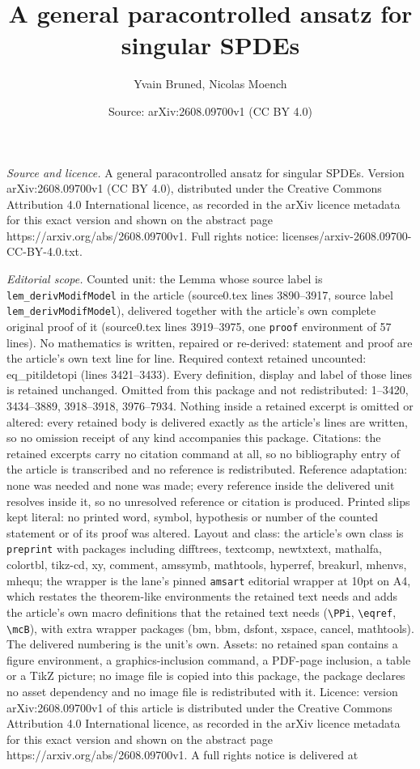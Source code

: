 \documentclass[10pt,a4paper]{amsart}
\title[A general paracontrolled ansatz for singular SPDEs]{A general paracontrolled ansatz for singular SPDEs}
\author{Yvain Bruned, Nicolas Moench}
\date{Source: arXiv:2608.09700v1 (CC BY 4.0)}
\begin{document}
\maketitle

\noindent\emph{Source and licence.} A general paracontrolled ansatz for singular SPDEs. Version arXiv:2608.09700v1 (CC BY 4.0), distributed under the Creative Commons Attribution 4.0 International licence, as recorded in the arXiv licence metadata for this exact version and shown on the abstract page https://arxiv.org/abs/2608.09700v1. Full rights notice: licenses/arxiv-2608.09700-CC-BY-4.0.txt.\par\smallskip

\noindent\textit{Editorial scope.} Counted unit: the Lemma whose source label is \texttt{lem\_derivModifModel} in the article (source0.tex lines 3890--3917, source label \texttt{lem\_derivModifModel}), delivered together with the article's own complete original proof of it (source0.tex lines 3919--3975, one \texttt{proof} environment of 57 lines). No mathematics is written, repaired or re-derived: statement and proof are the article's own text line for line. Required context retained uncounted: eq\_pitildetopi (lines 3421--3433). Every definition, display and label of those lines is retained unchanged. Omitted from this package and not redistributed: 1--3420, 3434--3889, 3918--3918, 3976--7934. Nothing inside a retained excerpt is omitted or altered: every retained body is delivered exactly as the article's lines are written, so no omission receipt of any kind accompanies this package. Citations: the retained excerpts carry no citation command at all, so no bibliography entry of the article is transcribed and no reference is redistributed. Reference adaptation: none was needed and none was made; every reference inside the delivered unit resolves inside it, so no unresolved reference or citation is produced. Printed slips kept literal: no printed word, symbol, hypothesis or number of the counted statement or of its proof was altered. Layout and class: the article's own class is \texttt{preprint} with packages including difftrees, textcomp, newtxtext, mathalfa, colortbl, tikz-cd, xy, comment, amssymb, mathtools, hyperref, breakurl, mhenvs, mhequ; the wrapper is the lane's pinned \texttt{amsart} editorial wrapper at 10pt on A4, which restates the theorem-like environments the retained text needs and adds the article's own macro definitions that the retained text needs (\texttt{\textbackslash PPi}, \texttt{\textbackslash eqref}, \texttt{\textbackslash mcB}), with extra wrapper packages (bm, bbm, dsfont, xspace, cancel, mathtools). The delivered numbering is the unit's own. Assets: no retained span contains a figure environment, a graphics-inclusion command, a PDF-page inclusion, a table or a TikZ picture; no image file is copied into this package, the package declares no asset dependency and no image file is redistributed with it. Licence: version arXiv:2608.09700v1 of this article is distributed under the Creative Commons Attribution 4.0 International licence, as recorded in the arXiv licence metadata for this exact version and shown on the abstract page https://arxiv.org/abs/2608.09700v1. A full rights notice is delivered at 
\end{document}
